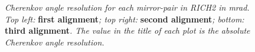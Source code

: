\begin{figure}[!h]
	\vspace*{-0.cm}
	\begin{center}
		\vspace*{-0.5cm}
	\end{center}
	\caption{\textit{Cherenkov angle resolution for each mirror-pair in RICH2 in mrad. Top left:} \textbf{first alignment}\textit{; top right:} \textbf{second alignment}\textit{; bottom:} \textbf{third alignment}\textit{. The value in the title of each plot is the absolute Cherenkov angle resolution. } }
	\label{fig:rich2maps}
\end{figure}


